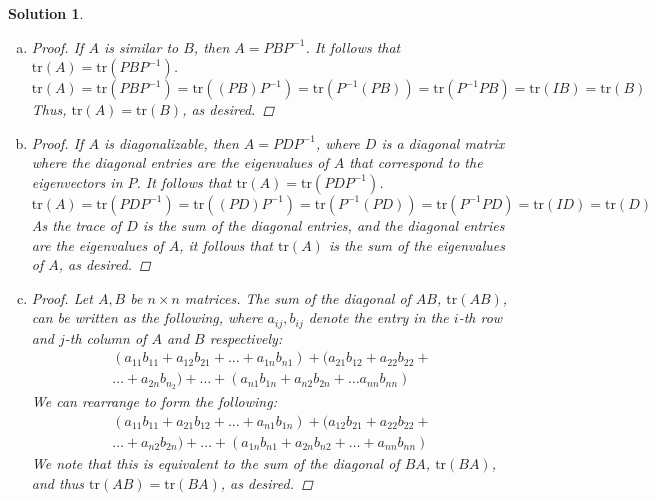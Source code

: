 \documentclass[11pt]{scrartcl}
\theoremstyle{dotlessP}
\newtheorem{sol}{Solution}[section]
\theoremstyle{dotlessN}
\newcommand{\tr}{\text{tr}}
\begin{document}
\begin{sol} \
	\begin{enumerate}[a)]
		\item
			\begin{proof}
				If $A$ is similar to $B$, then $A = PBP^{-1}$. It follows that $\tr(A) = \tr(PBP^{-1})$.
				\[
					\tr(A) = \tr(PBP^{-1}) = \tr((PB)P^{-1}) = \tr(P^{-1}(PB)) = \tr(P^{-1}PB) = \tr(IB) = \tr(B)
				\] 
				Thus, $\tr(A) = \tr(B)$, as desired.
			\end{proof}
		\item 
			\begin{proof}
				If $A$ is diagonalizable, then $A = PDP^{-1}$, where $D$ is a diagonal matrix where the diagonal entries are the eigenvalues of $A$ that correspond to the eigenvectors in $P$. It follows that $\tr(A) = \tr(PDP^{-1})$.
				\[
					\tr(A) = \tr(PDP^{-1}) = \tr((PD)P^{-1}) = \tr(P^{-1}(PD)) = \tr(P^{-1}PD) = \tr(ID) = \tr(D)
				\] 
				As the trace of $D$ is the sum of the diagonal entries, and the diagonal entries are the eigenvalues of $A$, it follows that $\tr(A)$ is the sum of the eigenvalues of $A$, as desired.
			\end{proof}
		\item 
			\begin{proof}
				Let $A,B$ be $n \times n$ matrices. The sum of the diagonal of $AB$, $\tr(AB)$, can be written as the following, where $a_{ij}, b_{ij}$ denote the entry in the $i$-th row and $j$-th column of $A$ and $B$ respectively:
				\begin{align*}
					(a_{11}b_{11} + a_{12}b_{21} + \dots + a_{1n}b_{n1}) + (a_{21}b_{12} + a_{22}b_{22} + \\
					\dots + a_{2n}b_{n_2}) +\dots + (a_{n1}b_{1n} + a_{n2}b_{2n} + \dots a_{nn}b_{nn})
				\end{align*}
				We can rearrange to form the following:
				\begin{align*}
					(a_{11}b_{11} + a_{21}b_{12} + \dots + a_{n1}b_{1n}) + (a_{12}b_{21} + a_{22}b_{22} + \\ 
					\dots + a_{n2}b_{2n}) + \dots + (a_{1n}b_{n1} + a_{2n}b_{n2} + \dots + a_{nn}b_{nn})
				\end{align*}
				We note that this is equivalent to the sum of the diagonal of $BA$, $\tr(BA)$, and thus $\tr(AB) = \tr(BA)$, as desired.
			\end{proof}
	\end{enumerate}
\end{sol}
\end{document}
